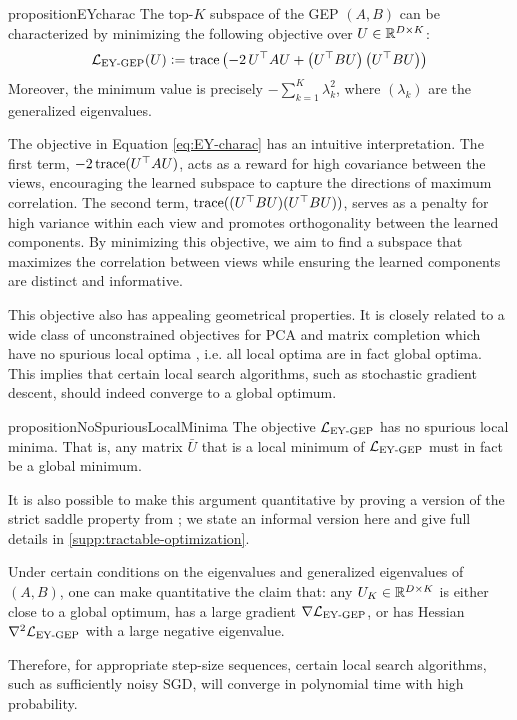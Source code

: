 \begin{restatable}{proposition}{EYcharac}
\label{prop:EY-charac}
    The top-$K$ subspace of the GEP $(A,B)$ can be characterized by minimizing the following objective over $U \in \mathbb{R}^{D \times K}$:
    \begin{align}\label{eq:EY-charac}
        \mathcal{L}_\text{EY-GEP}(U) \vcentcolon= \operatorname{trace} \left( - 2\,U^\top A U + \left(U^\top B U\right) \left(U^\top B U\right) \right)
    \end{align}
    Moreover, the minimum value is precisely $- \sum_{k=1}^K \lambda_k^2$, where $(\lambda_k)$ are the generalized eigenvalues.
\end{restatable}

The objective in Equation \eqref{eq:EY-charac} has an intuitive interpretation. The first term, $-2 \operatorname{trace}(U^\top A U)$, acts as a reward for high covariance between the views, encouraging the learned subspace to capture the directions of maximum correlation. The second term, $\operatorname{trace}((U^\top B U)(U^\top B U))$, serves as a penalty for high variance within each view and promotes orthogonality between the learned components. By minimizing this objective, we aim to find a subspace that maximizes the correlation between views while ensuring the learned components are distinct and informative.

This objective also has appealing geometrical properties. 
It is closely related to a wide class of unconstrained objectives for PCA and matrix completion which have no spurious local optima \citep{ge_no_2017}, i.e. all local optima are in fact global optima. 
This implies that certain local search algorithms, such as stochastic gradient descent, should indeed converge to a global optimum.

\begin{restatable}{proposition}{NoSpuriousLocalMinima}\label{prop:no-spurious}
    The objective $\mathcal{L}_\text{EY-GEP}$ has no spurious local minima.
    That is, any matrix $\bar{U}$ that is a local minimum of $\mathcal{L}_\text{EY-GEP}$ must in fact be a global minimum.
\end{restatable}

It is also possible to make this argument quantitative by proving a version of the strict saddle property from \citet{ge_no_2017,ge2015escaping}; we state an informal version here and give full details in \cref{supp:tractable-optimization}.

\begin{corollary}
    Under certain conditions on the eigenvalues and generalized eigenvalues of $(A,B)$, one can make quantitative the claim that:
    any $U_K \in \mathbb{R}^{D \times K}$ is either close to a global optimum, has a large gradient $\nabla \mathcal{L}_\text{EY-GEP}$, or has Hessian $\nabla^2 \mathcal{L}_\text{EY-GEP}$ with a large negative eigenvalue.
    
    Therefore, for appropriate step-size sequences, certain local search algorithms, such as sufficiently noisy SGD, will converge in polynomial time with high probability.
\end{corollary}

